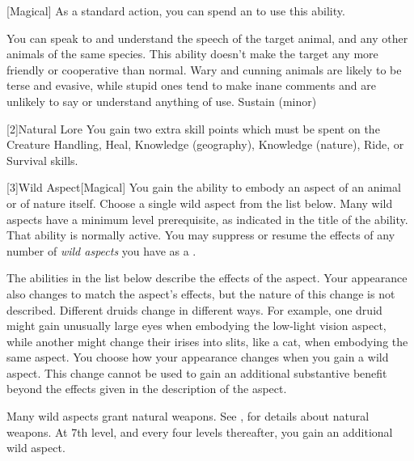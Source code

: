         [Magical] As a standard action, you can spend an  to use this ability.
        \begin{ability}
            \begin{spelltargetinginfo}
            \end{spelltargetinginfo}
            \begin{spelleffects}
                \spelleffect You can speak to and understand the speech of the target animal, and any other animals of the same species.
                This ability doesn't make the target any more friendly or cooperative than normal.
                Wary and cunning animals are likely to be terse and evasive, while stupid ones tend to make inane comments and are unlikely to say or understand anything of use.
                \spelldur Sustain (minor)
            \end{spelleffects}
        \end{ability}

        [2]{Natural Lore}
        You gain two extra skill points which must be spent on the Creature Handling, Heal, Knowledge (geography), Knowledge (nature), Ride, or Survival skills.

        [3]{Wild Aspect}[Magical]
        You gain the ability to embody an aspect of an animal or of nature itself.
        Choose a single wild aspect from the list below.
        Many wild aspects have a minimum level prerequisite, as indicated in the title of the ability.
        That ability is normally active.
        You may suppress or resume the effects of any number of \textit{wild aspects} you have as a .

        The abilities in the list below describe the effects of the aspect.
        Your appearance also changes to match the aspect's effects, but the nature of this change is not described.
        Different druids change in different ways.
        For example, one druid might gain unusually large eyes when embodying the low-light vision aspect, while another might change their irises into slits, like a cat, when embodying the same aspect.
        You choose how your appearance changes when you gain a wild aspect.
        This change cannot be used to gain an additional substantive benefit beyond the effects given in the description of the aspect.

        Many wild aspects grant natural weapons.
        See , for details about natural weapons.
        At 7th level, and every four levels thereafter, you gain an additional wild aspect.

